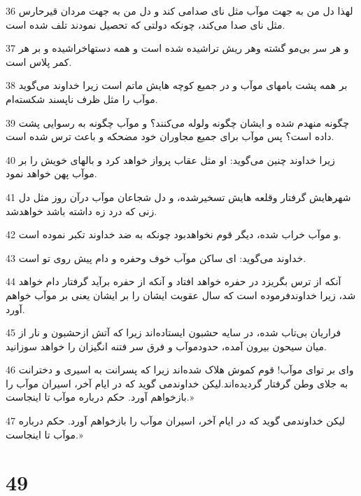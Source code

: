 \par 36 لهذا دل من به جهت موآب مثل نای صدامی کند و دل من به جهت مردان قیرحارس مثل نای صدا می‌کند، چونکه دولتی که تحصیل نمودند تلف شده است.
\par 37 و هر سر بی‌مو گشته وهر ریش تراشیده شده است و همه دستهاخراشیده و بر هر کمر پلاس است.
\par 38 بر همه پشت بامهای موآب و در جمیع کوچه هایش ماتم است زیرا خداوند می‌گوید موآب را مثل ظرف ناپسند شکسته‌ام.
\par 39 چگونه منهدم شده و ایشان چگونه ولوله می‌کنند؟ و موآب چگونه به رسوایی پشت داده است؟ پس موآب برای جمیع مجاوران خود مضحکه و باعث ترس شده است.
\par 40 زیرا خداوند چنین می‌گوید: او مثل عقاب پرواز خواهد کرد و بالهای خویش را بر موآب پهن خواهد نمود.
\par 41 شهرهایش گرفتار وقلعه هایش تسخیرشده، و دل شجاعان موآب درآن روز مثل دل زنی که درد زه داشته باشد خواهدشد.
\par 42 و موآب خراب شده، دیگر قوم نخواهدبود چونکه به ضد خداوند تکبر نموده است.
\par 43 خداوند می‌گوید: ای ساکن موآب خوف وحفره و دام پیش روی تو است.
\par 44 آنکه از ترس بگریزد در حفره خواهد افتاد و آنکه از حفره برآید گرفتار دام خواهد شد، زیرا خداوندفرموده است که سال عقوبت ایشان را بر ایشان یعنی بر موآب خواهم آورد.
\par 45 فراریان بی‌تاب شده، در سایه حشبون ایستاده‌اند زیرا که آتش ازحشبون و نار از میان سیحون بیرون آمده، حدودموآب و فرق سر فتنه انگیزان را خواهد سوزانید.
\par 46 وای بر تو‌ای موآب! قوم کموش هلاک شده‌اند زیرا که پسرانت به اسیری و دخترانت به جلای وطن گرفتار گردیده‌اند.لیکن خداوندمی گوید که در ایام آخر، اسیران موآب را بازخواهم آورد. حکم درباره موآب تا اینجاست.» 
\par 47 لیکن خداوندمی گوید که در ایام آخر، اسیران موآب را بازخواهم آورد. حکم درباره موآب تا اینجاست.»
 
\chapter{49}

